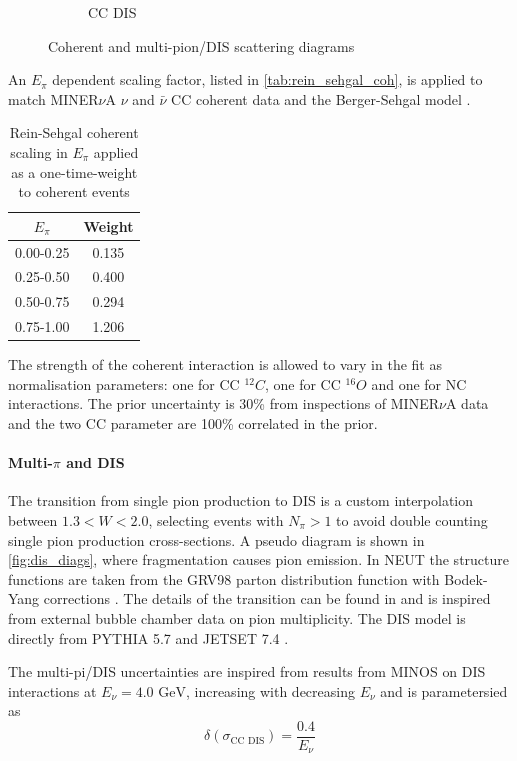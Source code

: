 \begin{figure}[h]
\begin{subfigure}[t]{0.42\textwidth}
		\caption{CC DIS}
		\label{fig:dis_diags}
	\end{subfigure}
	\caption{Coherent and multi-pion/DIS scattering diagrams}
	\label{fig:coh_dis_diags}
\end{figure}

An $E_\pi$ dependent scaling factor, listed in \autoref{tab:rein_sehgal_coh}, is applied to match MINER$\nu$A $\nu$ and $\bar{\nu}$ CC coherent data \cite{MIN_coh} and the Berger-Sehgal model \cite{Berger_Sehgal_coh}.
\begin{table}[h]
	\begin{tabular}{c | c}
		\hline
		\hline
		$E_\pi$ & Weight \\
		\hline
		0.00-0.25 & 0.135 \\
		0.25-0.50 & 0.400 \\
		0.50-0.75 & 0.294 \\
		0.75-1.00 & 1.206 \\
		\hline
		\hline
	\end{tabular}
\caption{Rein-Sehgal coherent scaling in $E_\pi$ applied as a one-time-weight to coherent events}
\label{tab:rein_sehgal_coh}
\end{table}

The strength of the coherent interaction is allowed to vary in the fit as normalisation parameters: one for CC $^{12}C$, one for CC $^{16}O$ and one for NC interactions. The prior uncertainty is 30\% from inspections of MINER$\nu$A data and the two CC parameter are 100\% correlated in the prior.

\paragraph{Multi-$\pi$ and DIS}
The transition from single pion production to DIS is a custom interpolation between $1.3 < W < 2.0$, selecting events with $N_\pi>1$ to avoid double counting single pion production cross-sections. A pseudo diagram is shown in \autoref{fig:dis_diags}, where fragmentation causes pion emission. In NEUT the structure functions are taken from the GRV98 parton distribution function \cite{grv98} with Bodek-Yang corrections \cite{bodek_yang}. The details of the transition can be found in \cite{neut} and is inspired from external bubble chamber data on pion multiplicity. The DIS model is directly from PYTHIA 5.7 and JETSET 7.4 \cite{pythia}.

The multi-pi/DIS uncertainties are inspired from results from MINOS \cite{minos_mult} on DIS interactions at $E_\nu = 4.0 \text{ GeV}$, increasing with decreasing $E_\nu$ and is parametersied as 
\begin{equation}
\delta\left(\sigma_\text{CC DIS}\right) = \frac{0.4}{E_\nu}
\end{equation}

